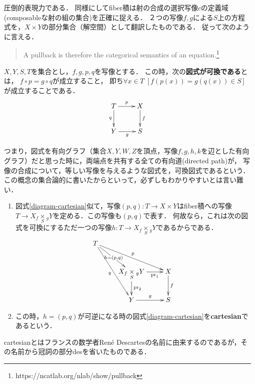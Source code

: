 \documentclass[uplatex, dvipdfmx]{jsreport}
\begin{document}
圧倒的表現力である．
同様にしてfiber積は射の合成の選択写像$c$の定義域(composableな射の組の集合)を正確に捉える．
２つの写像$f,g$による$S$上の方程式を，$X\times Y$の部分集合（解空間）として翻訳したものである．
従って次のように言える．
\begin{quote}
    A pullback is therefore the categorical semantics of an equation.\footnote{https://ncatlab.org/nlab/show/pullback}
\end{quote}

\begin{definition}[写像の可換図式]
    $X,Y,S,T$を集合とし，$f,g,p,q$を写像とする．
    この時，次の\textbf{図式が可換である}とは，
    $f\circ p=g\circ q$が成立すること，
    即ち$\forall x\in T \; [f(p(x))=g(q(x)) \in S]$が成立することである．
    \begin{equation}
        \xymatrix{
        T\ar[r]^-p\ar[d]_-q&X\ar[d]^-f\\
        Y\ar[r]_-g&S
        }
    \label{diagram-cartesian}
    \end{equation}
\end{definition}
\begin{remark}
    つまり，図式を有向グラフ（集合$X,Y,W,Z$を頂点，写像$f,g,h,k$を辺とした有向グラフ）だと思った時に，両端点を共有する全ての有向道(directed path)が，
    写像の合成について，等しい写像を与えるような図式を，可換図式であるという．
    この概念の集合論的に書いたからといって，必ずしもわかりやすいとは言い難い．
\end{remark}
\begin{definition}[cartesian]\mbox{}
    \begin{enumerate}
        \item 図式\ref{diagram-cartesian}似て，写像$(p,q):T\to X\times Y$はfiber積への写像$T\to X_f\underset{S}{\times}{}_{g}Y$を定める．この写像も$(p,q)$で表す．
        何故なら，これは次の図式を可換にするただ一つの写像$h:T\to X_f\underset{S}{\times}{}_{g}Y$であるからである．
        \[\xymatrix{
            T\ar[dr]|{h=(p,q)}\ar[drr]^-p\ar[ddr]_-q\\
            &{X_f\underset{S}{\times}{}_{g}Y}\ar[r]_-{\pr_1}\ar[d]^-{\pr_2}&X\ar[d]^-f\\
            &Y\ar[r]^-g&S
        }\]
        \item この時，$h=(p,q)$が可逆になる時の図式\ref{diagram-cartesian}を\textbf{cartesian}であるという．
    \end{enumerate}
\end{definition}
\begin{remark}
    cartesianとはフランスの数学者René Descartesの名前に由来するのであるが，その名前から冠詞の部分desを省いたものである．
\end{remark}
\end{document}
